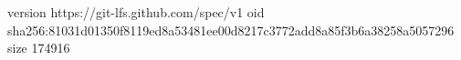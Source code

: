 version https://git-lfs.github.com/spec/v1
oid sha256:81031d01350f8119ed8a53481ee00d8217c3772add8a85f3b6a38258a5057296
size 174916
